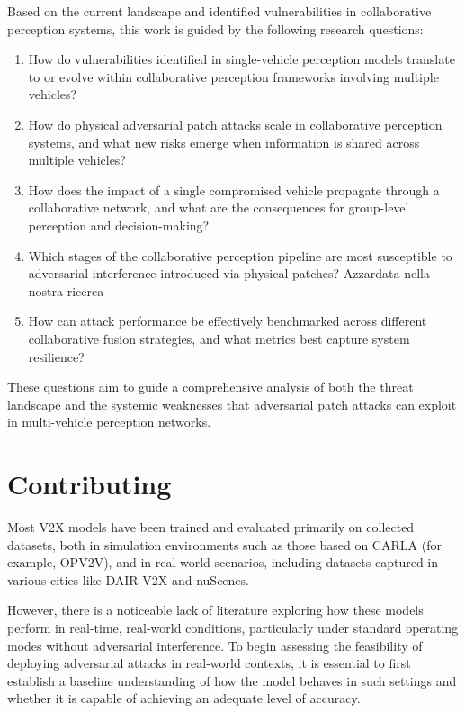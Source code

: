 Based on the current landscape and identified vulnerabilities in collaborative perception systems, this work is guided by the following research questions:
\begin{enumerate}
    \item How do vulnerabilities identified in single-vehicle perception models translate to or evolve within collaborative perception frameworks involving multiple vehicles?
    \item How do physical adversarial patch attacks scale in collaborative perception systems, and what new risks emerge when information is shared across multiple vehicles?
    \item How does the impact of a single compromised vehicle propagate through a collaborative network, and what are the consequences for group-level perception and decision-making?
    \item Which stages of the collaborative perception pipeline are most susceptible to adversarial interference introduced via physical patches? Azzardata nella nostra ricerca
    \item How can attack performance be effectively benchmarked across different collaborative fusion strategies, and what metrics best capture system resilience?
\end{enumerate}
These questions aim to guide a comprehensive analysis of both the threat landscape and the systemic weaknesses that adversarial patch attacks can exploit in multi-vehicle perception networks.

\section{Contributing}

Most V2X models have been trained and evaluated primarily on collected datasets, both in simulation environments such as those based on CARLA (for example, OPV2V\cite{xu2022opv2vopenbenchmarkdataset}),
and in real-world scenarios, including datasets captured in various cities like DAIR-V2X\cite{DAIR-V2X2021} and nuScenes\cite{nuscenes2019}.

However, there is a noticeable lack of literature exploring how these models perform in real-time, real-world conditions,
particularly under standard operating modes without adversarial interference. To begin assessing the feasibility of deploying adversarial attacks in real-world contexts,
it is essential to first establish a baseline understanding of how the model behaves in such settings and whether it is capable of achieving an adequate level of accuracy.

